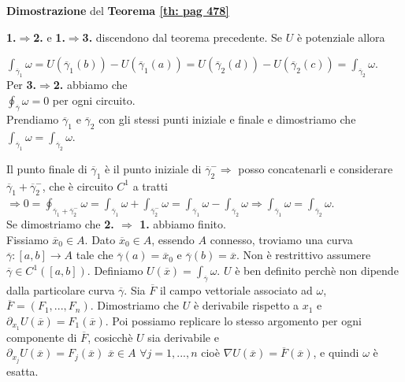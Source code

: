 \begin{dembar}
	\textbf{Dimostrazione} del \textbf{Teorema \ref{th: pag 478}}
	
	\textbf{1.$\Rightarrow $2.} e \textbf{1.$\Rightarrow $3.} discendono dal teorema precedente. Se $U$ è potenziale allora
	
	$\int_{\overline{\gamma}_1}\omega=U(\overline{\gamma}_1(b))-U(\overline{\gamma}_1(a))=U(\overline{\gamma}_2(d))-U(\overline{\gamma}_2(c))=\int_{\overline{\gamma}_2}\omega$.\\
	Per \textbf{3.$\Rightarrow$2.} abbiamo che\\
	$\oint_{\overline{\gamma}}\omega =0$ per ogni circuito.\\
	Prendiamo $\overline{\gamma}_1$ e $\overline{\gamma}_2$ con gli stessi punti iniziale e finale e dimostriamo che $\int_{\overline{\gamma}_1}\omega=\int_{\overline{\gamma}_2}\omega$.\\

	\segnaposto %

	Il punto finale di $\overline{\gamma}_1$ è il punto iniziale di $\overline{\gamma}_2^- \Rightarrow$ posso concatenarli e considerare $\overline{\gamma}_1+\overline{\gamma}_2^-$, che è circuito $C^1$ a tratti\\
	$\Rightarrow 0 =\oint_{\overline{\gamma}_1+\overline{\gamma}_2^-}\omega=\int_{\overline{\gamma}_1}\omega+\int_{\overline{\gamma}_2^-}\omega= \int_{\overline{\gamma}_1}\omega - \int_{\overline{\gamma}_2}\omega\Rightarrow \int_{\overline{\gamma}_1}\omega = \int_{\overline{\gamma}_2}\omega$.\\
	Se dimostriamo che \textbf{2. $\Rightarrow$ 1.} abbiamo finito.\\
	Fissiamo $\overline{x}_0\in A$. Dato $\overline{x}_0 \in A$,  essendo $A$ connesso, troviamo una curva $\overline{\gamma}:[a,b]\rightarrow A$ tale che $\overline{\gamma}(a)=\overline{x}_0$ e $\overline{\gamma}(b)=\overline{x}$. Non è restrittivo assumere $\overline{\gamma}\in C^1([a,b])$. Definiamo $U(\overline{x})=\int_{\overline{\gamma}}\omega$. $U $ è ben definito perchè non dipende dalla particolare curva $\overline{\gamma}$. Sia $\overline{F}$ il campo vettoriale associato ad $\omega$, $\overline{F}=(F_1,...,F_n)$. Dimostriamo che $U$ è derivabile rispetto a $x_1$ e $\partial_{x_1}U(\overline{x})=F_1(\overline{x})$. Poi possiamo replicare lo stesso argomento per ogni componente di $\overline{F}$, cosicchè $U$ sia derivabile e $\partial_{x_j}U(\overline{x})=F_j(\overline{x})\,\, \overline{x}\in A\,\, \forall j=1,...,n$ cioè $\nabla U(\overline{x})=\overline{F}(\overline{x})$, e quindi $\omega$ è esatta.\\


\end{dembar}
